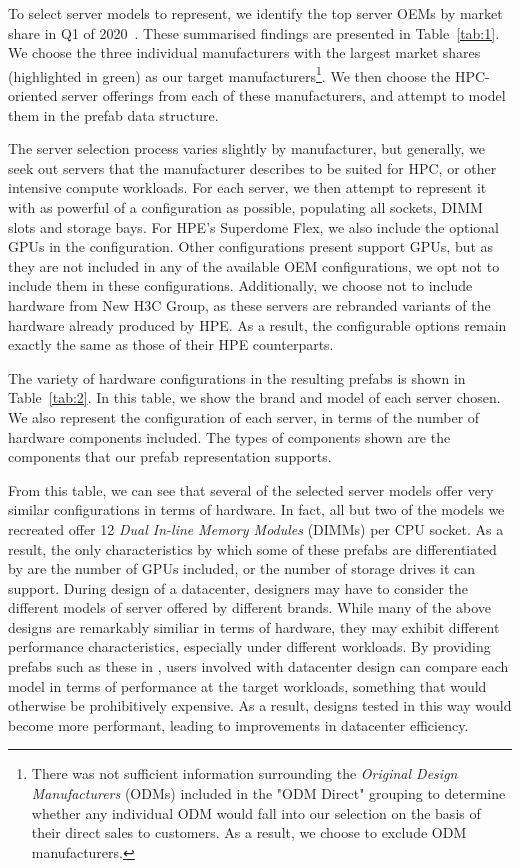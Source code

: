 \documentclass[11pt]{article}
\begin{document}
			To select server models to represent, we identify the top server OEMs by market share in Q1 of 2020~\cite{Macatee2020}. These summarised findings are presented in Table~\ref{tab:1}.
			We choose the three individual manufacturers with the largest market shares (highlighted in green) as our target manufacturers\footnote{There was not sufficient information surrounding the \textit{Original Design Manufacturers} (ODMs) included in the "ODM Direct" grouping to determine whether any individual ODM would fall into our selection on the basis of their direct sales to customers. As a result, we choose to exclude ODM manufacturers.}.
			We then choose the HPC-oriented server offerings from each of these manufacturers, and attempt to model them in the prefab data structure.
			
			The server selection process varies slightly by manufacturer, but generally, we seek out servers that the manufacturer describes to be suited for HPC, or other intensive compute workloads.
			For each server, we then attempt to represent it with as powerful of a configuration as possible, populating all sockets, DIMM slots and storage bays.
			For HPE's Superdome Flex, we also include the optional GPUs in the configuration.
			Other configurations present support GPUs, but as they are not included in any of the available OEM configurations, we opt not to include them in these configurations.
			Additionally, we choose not to include hardware from New H3C Group, as these servers are rebranded variants of the hardware already produced by HPE.
			As a result, the configurable options remain exactly the same as those of their HPE counterparts.

			The variety of hardware configurations in the resulting prefabs is shown in Table~\ref{tab:2}.
			In this table, we show the brand and model of each server chosen.
			We also represent the configuration of each server, in terms of the number of hardware components included.
			The types of components shown are the components that our prefab representation supports.

			From this table, we can see that several of the selected server models offer very similar configurations in terms of hardware.
			In fact, all but two of the models we recreated offer 12 \textit{Dual In-line Memory Modules} (DIMMs) per CPU socket.
			As a result, the only characteristics by which some of these prefabs are differentiated by are the number of GPUs included, or the number of storage drives it can support.
			During design of a datacenter, designers may have to consider the different models of server offered by different brands.
			While many of the above designs are remarkably similiar in terms of hardware, they may exhibit different performance characteristics, especially under different workloads.
			By providing prefabs such as these in \opendc{}, users involved with datacenter design can compare each model in terms of performance at the target workloads, something that would otherwise be prohibitively expensive.
			As a result, designs tested in this way would become more performant, leading to improvements in datacenter efficiency.
\end{document}
